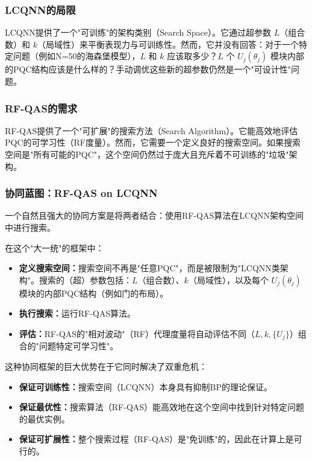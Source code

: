 \documentclass[12pt,a4paper]{article}
\begin{document}
\subsubsection{LCQNN的局限}

LCQNN提供了一个"可训练"的架构类别（Search Space）。它通过超参数 $L$（组合数）和 $k$（局域性）来平衡表现力与可训练性。然而，它并没有回答：对于一个特定问题（例如N=50的海森堡模型），$L$ 和 $k$ 应该取多少？$L$ 个 $U_j(\theta_j)$ 模块内部的PQC结构应该是什么样的？手动调优这些新的超参数仍然是一个"可设计性"问题。

\subsubsection{RF-QAS的需求}

RF-QAS提供了一个"可扩展"的搜索方法（Search Algorithm）。它能高效地评估PQC的可学习性（RF度量）。然而，它需要一个定义良好的搜索空间。如果搜索空间是"所有可能的PQC"，这个空间仍然过于庞大且充斥着不可训练的"垃圾"架构。

\subsubsection{协同蓝图：RF-QAS on LCQNN}

一个自然且强大的协同方案是将两者结合：使用RF-QAS算法在LCQNN架构空间中进行搜索。

在这个"大一统"的框架中：
\begin{itemize}
\item \textbf{定义搜索空间：}搜索空间不再是"任意PQC"，而是被限制为"LCQNN类架构"。搜索的（超）参数包括：$L$（组合数）、$k$（局域性），以及每个 $U_j(\theta_j)$ 模块的内部PQC结构（例如门的布局）。
\item \textbf{执行搜索：}运行RF-QAS算法。
\item \textbf{评估：}RF-QAS的"相对波动"（RF）代理度量将自动评估不同（$L, k, \{U_j\}$）组合的"问题特定可学习性"。
\end{itemize}

这种协同框架的巨大优势在于它同时解决了双重危机：
\begin{itemize}
\item \textbf{保证可训练性：}搜索空间（LCQNN）本身具有抑制BP的理论保证。
\item \textbf{保证最优性：}搜索算法（RF-QAS）能高效地在这个空间中找到针对特定问题的最优实例。
\item \textbf{保证可扩展性：}整个搜索过程（RF-QAS）是"免训练"的，因此在计算上是可行的。
\end{itemize}
\end{document}

